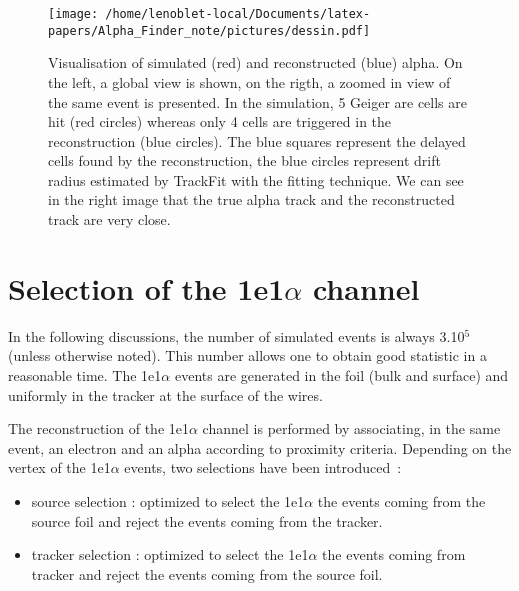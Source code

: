 \documentclass[main.tex]{subfiles}
\begin{document}
\begin{figure}[h!]
\begin{center}
\texttt{[image: /home/lenoblet-local/Documents/latex-papers/Alpha\_Finder\_note/pictures/dessin.pdf]}
\caption{Visualisation of simulated (red) and reconstructed (blue) alpha. On the left, a global view is shown, on the rigth, a zoomed in view of the same event is presented. In the simulation, 5 Geiger are cells are hit (red circles) whereas only 4 cells are triggered in the reconstruction (blue circles). The blue squares represent the delayed cells found by the reconstruction, the blue circles represent drift radius estimated by TrackFit with the fitting technique. We can see in the right image that the true alpha track and the reconstructed track are very close.}
\label{timeRecovisu}
\end{center}
\end{figure}


\FloatBarrier




\section{Selection of the 1e1$\alpha$ channel}\label{sec:Selection1e1aChannel}

	
\noindent In the following discussions, the number of simulated events is always 3.10$^\text{5}$ (unless otherwise noted). This number allows one to obtain good statistic in a reasonable time. The 1e1$\alpha$ events are generated in the foil (bulk and surface) and uniformly in the tracker at the surface of the wires. %


\bigskip


\noindent  The reconstruction of the 1e1$\alpha$ channel is performed by associating, in the same event, an electron and an alpha according to proximity criteria. Depending on the vertex of the 1e1$\alpha$ events, two selections have been introduced~: 


\begin{itemize}
\item source selection : optimized to select the 1e1$\alpha$ the events coming from the source foil and reject the events coming from the tracker.

\item tracker selection : optimized to select the 1e1$\alpha$ the events coming from tracker and reject the events coming from the source foil.
\end{itemize}
\end{document}
